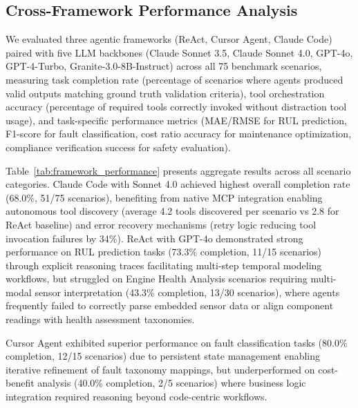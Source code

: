 \documentclass[sigconf, screen, nonacm]{acmart}
\begin{document}
\subsection{Cross-Framework Performance Analysis}

  We evaluated three agentic frameworks (ReAct, Cursor Agent, Claude Code)   
  paired with five LLM backbones (Claude Sonnet 3.5, Claude Sonnet 4.0,      
  GPT-4o, GPT-4-Turbo, Granite-3.0-8B-Instruct) across all 75 benchmark      
  scenarios, measuring task completion rate (percentage of scenarios where   
  agents produced valid outputs matching ground truth validation criteria),  
  tool orchestration accuracy (percentage of required tools correctly invoked
   without distraction tool usage), and task-specific performance metrics    
  (MAE/RMSE for RUL prediction, F1-score for fault classification, cost ratio
   accuracy for maintenance optimization, compliance verification success for
   safety evaluation). 
   
   Table~\ref{tab:framework_performance} presents        
  aggregate results across all scenario categories. Claude Code with Sonnet  
  4.0 achieved highest overall completion rate (68.0\%, 51/75 scenarios),    
  benefiting from native MCP integration enabling autonomous tool discovery  
  (average 4.2 tools discovered per scenario vs 2.8 for ReAct baseline) and  
  error recovery mechanisms (retry logic reducing tool invocation failures by
   34\%). ReAct with GPT-4o demonstrated strong performance on RUL prediction
   tasks (73.3\% completion, 11/15 scenarios) through explicit reasoning     
  traces facilitating multi-step temporal modeling workflows, but struggled  
  on Engine Health Analysis scenarios requiring multi-modal sensor           
  interpretation (43.3\% completion, 13/30 scenarios), where agents          
  frequently failed to correctly parse embedded sensor data or align         
  component readings with health assessment taxonomies. 
  
  Cursor Agent         
  exhibited superior performance on fault classification tasks (80.0\%       
  completion, 12/15 scenarios) due to persistent state management enabling   
  iterative refinement of fault taxonomy mappings, but underperformed on     
  cost-benefit analysis (40.0\% completion, 2/5 scenarios) where business    
  logic integration required reasoning beyond code-centric workflows. 
  
\end{document}
